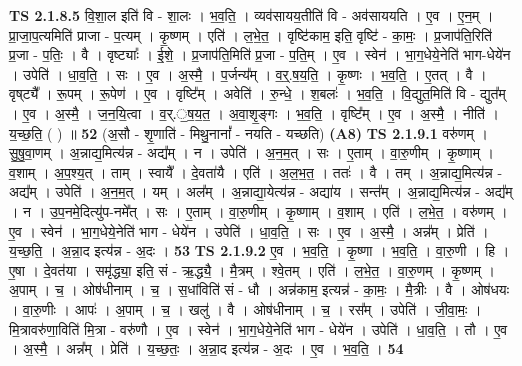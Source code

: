 \documentclass[17pt]{extarticle}
\begin{document}
                  \newline
                                \textbf{ TS 2.1.8.5} \newline
                  वि॒शा॒ल इति॑ वि - शा॒लः । भ॒व॒ति॒ । व्यव॑सायय॒तीति॑ वि - अव॑साययति । ए॒व । ए॒न॒म् । प्रा॒जा॒प॒त्यमिति॑ प्राजा - प॒त्यम् । कृ॒ष्णम् । एति॑ । ल॒भे॒त॒ । वृष्टि॑काम॒ इति॒ वृष्टि॑ - का॒मः॒ । प्र॒जाप॑ति॒रिति॑ प्र॒जा - प॒तिः॒ । वै । वृष्ट्याः᳚ । ई॒शे॒ । प्र॒जाप॑ति॒मिति॑ प्र॒जा - प॒ति॒म् । ए॒व । स्वेन॑ । भा॒ग॒धेये॒नेति॑ भाग-धेये॑न । उपेति॑ । धा॒व॒ति॒ । सः । ए॒व । अ॒स्मै॒ । प॒र्जन्य᳚म् । व॒र्॒.ष॒य॒ति॒ । कृ॒ष्णः । भ॒व॒ति॒ । ए॒तत् । वै । वृष्‌ट्यै᳚ । रू॒पम् । रू॒पेण॑ । ए॒व । वृष्टि᳚म् । अवेति॑ । रु॒न्धे॒ । श॒बलः॑ । भ॒व॒ति॒ । वि॒द्युत॒मिति॑ वि - द्युत᳚म् । ए॒व । अ॒स्मै॒ । ज॒न॒यि॒त्वा । व॒र्.॒ष॒य॒त॒ । अ॒वा॒शृ॒ङ्गः । भ॒व॒ति॒ । वृष्टि᳚म् । ए॒व । अ॒स्मै॒ । नीति॑ । य॒च्छ॒ति॒ ( ) ॥ \textbf{  52} \newline
                  \newline
                      (अ॒सौ - शृ॒णाति॑ - मिथु॒नानां᳚ - नयति - यच्छति)  \textbf{(A8)} \newline \newline
                                \textbf{ TS 2.1.9.1} \newline
                  वरु॑णम् । सु॒षु॒वा॒णम् । अ॒न्नाद्य॒मित्य॑न्न - अद्य᳚म् । न । उपेति॑ । अ॒न॒म॒त् । सः । ए॒ताम् । वा॒रु॒णीम् । कृ॒ष्णाम् । व॒शाम् । अ॒प॒श्य॒त् । ताम् । स्वायै᳚ । दे॒वता॑यै । एति॑ । अ॒ल॒भ॒त॒ । ततः॑ । वै । तम् । अ॒न्नाद्य॒मित्य॑न्न - अद्य᳚म् । उपेति॑ । अ॒न॒म॒त् । यम् । अल᳚म् । अ॒न्नाद्या॒येत्य॑न्न - अद्या॑य । सन्त᳚म् । अ॒न्नाद्य॒मित्य॑न्न - अद्य᳚म् । न । उ॒प॒नमे॒दित्यु॑प-नमे᳚त् । सः । ए॒ताम् । वा॒रु॒णीम् । कृ॒ष्णाम् । व॒शाम् । एति॑ । ल॒भे॒त॒ । वरु॑णम् । ए॒व । स्वेन॑ । भा॒ग॒धेये॒नेति॑ भाग - धेये॑न । उपेति॑ । धा॒व॒ति॒ । सः । ए॒व । अ॒स्मै॒ । अन्न᳚म् । प्रेति॑ । य॒च्छ॒ति॒ । अ॒न्ना॒द इत्य॑न्न - अ॒दः । \textbf{  53} \newline
                  \newline
                                \textbf{ TS 2.1.9.2} \newline
                  ए॒व । भ॒व॒ति॒ । कृ॒ष्णा । भ॒व॒ति॒ । वा॒रु॒णी । हि । ए॒षा । दे॒वत॑या । समृ॑द्ध्या॒ इति॒ सं - ऋ॒द्ध्यै॒ । मै॒त्रम् । श्वे॒तम् । एति॑ । ल॒भे॒त॒ । वा॒रु॒णम् । कृ॒ष्णम् । अ॒पाम् । च॒ । ओष॑धीनाम् । च॒ । स॒धांविति॑ सं - धौ । अन्न॑काम॒ इत्यन्न॑ - का॒मः॒ । मै॒त्रीः । वै । ओष॑धयः । वा॒रु॒णीः । आपः॑ । अ॒पाम् । च॒ । खलु॑ । वै । ओष॑धीनाम् । च॒ । रस᳚म् । उपेति॑ । जी॒वा॒मः॒ । मि॒त्रावरु॑णा॒विति॑ मि॒त्रा - वरु॑णौ । ए॒व । स्वेन॑ । भा॒ग॒धेये॒नेति॑ भाग - धेये॑न । उपेति॑ । धा॒व॒ति॒ । तौ । ए॒व । अ॒स्मै॒ । अन्न᳚म् । प्रेति॑ । य॒च्छ॒तः॒ । अ॒न्ना॒द इत्य॑न्न - अ॒दः । ए॒व । भ॒व॒ति॒ । \textbf{  54} \newline
\end{document}
